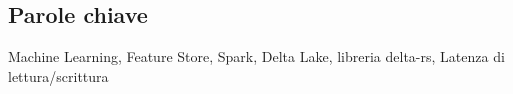 \begin{scontents}[store-env=abstracts,print-env=true]
\end{scontents}
\subsection*{Parole chiave}
\begin{scontents}[store-env=keywords,print-env=true]
Machine Learning, Feature Store, Spark, Delta Lake, libreria delta-rs, Latenza di lettura/scrittura
\end{scontents}